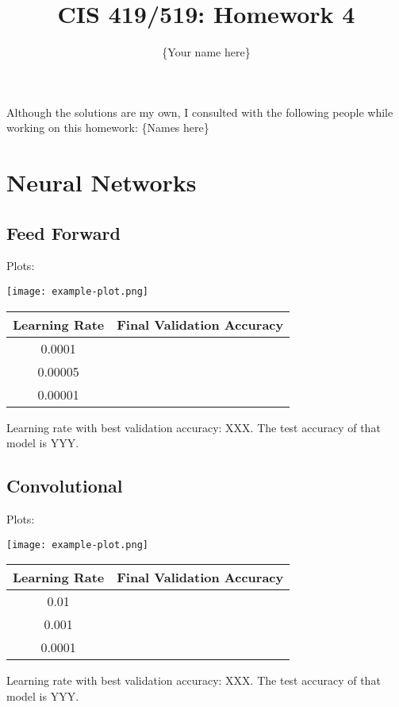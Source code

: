 \documentclass{article}
\title{CIS 419/519: Homework 4}
\author{\{Your name here\}}
\date{}
\begin{document}
\maketitle
    Although the solutions are my own, I consulted with the following people while working on this homework: \{Names here\} \\


\section*{Neural Networks}
\subsection*{Feed Forward}
Plots:
\begin{center}
    \texttt{[image: example-plot.png]} %
\end{center}

\begin{center}
    \begin{tabular}{|c|c|}
        \hline
        Learning Rate & Final Validation Accuracy \\
        \hline
        0.0001 & \\
        0.00005 & \\
        0.00001 & \\
        \hline
    \end{tabular}
\end{center}
Learning rate with best validation accuracy: XXX.
The test accuracy of that model is YYY.

\subsection*{Convolutional}
Plots:
\begin{center}
    \texttt{[image: example-plot.png]} %
\end{center}

\begin{center}
    \begin{tabular}{|c|c|}
        \hline
        Learning Rate & Final Validation Accuracy \\
        \hline
        0.01 & \\
        0.001 & \\
        0.0001 & \\
        \hline
    \end{tabular}
\end{center}
Learning rate with best validation accuracy: XXX.
The test accuracy of that model is YYY.
\end{document}
